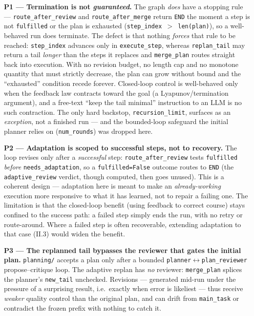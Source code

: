 \documentclass[11pt]{article}
\newcommand{\code}[1]{\texttt{#1}}
\begin{document}
\textbf{P1 --- Termination is not \emph{guaranteed}.} The graph \emph{does} have a stopping rule --- \code{route\_after\_review}
and \code{route\_after\_merge} return \code{END} the moment a step is not \code{fulfilled} or the plan is exhausted
(\code{step\_index $>$ len(plan)}), so a well-behaved run does terminate. The defect is that nothing \emph{forces} that rule to be
reached: \code{step\_index} advances only in \code{execute\_step}, whereas \code{replan\_tail} may return a tail \emph{longer} than
the steps it replaces and \code{merge\_plan} routes straight back into execution. With no revision budget, no length cap and no
monotone quantity that must strictly decrease, the plan can grow without bound and the ``exhausted'' condition recede forever.
Closed-loop control is well-behaved only when the feedback law contracts toward the goal (a Lyapunov/termination argument), and a
free-text ``keep the tail minimal'' instruction to an LLM is no such contraction. The only hard backstop, \code{recursion\_limit},
surfaces as an \emph{exception}, not a finished run --- and the bounded-loop safeguard the initial planner relies on
(\code{num\_rounds}) was dropped here.

\textbf{P2 --- Adaptation is scoped to successful steps, not to recovery.} The loop revises only after a \emph{successful} step:
\code{route\_after\_review} tests \code{fulfilled} \emph{before} \code{needs\_adaptation}, so a \code{fulfilled=False} outcome routes
to \code{END} (the \code{adaptive\_review} verdict, though computed, then goes unused). This is a coherent design --- adaptation here
is meant to make an \emph{already-working} execution more responsive to what it has learned, not to repair a failing one. The
limitation is that the closed-loop benefit (using feedback to correct course) stays confined to the success path: a failed step
simply ends the run, with no retry or route-around. Where a failed step is often recoverable, extending adaptation to that case
(II.3) would widen the benefit.

\textbf{P3 --- The replanned tail bypasses the reviewer that gates the initial plan.} \code{planning/} accepts a plan only after a
bounded \code{planner}$\leftrightarrow$\code{plan\_reviewer} propose--critique loop. The adaptive replan has \emph{no} reviewer:
\code{merge\_plan} splices the planner's \code{new\_tail} unchecked. Revisions --- generated mid-run under the pressure of a
surprising result, i.e.\ exactly when error is likeliest --- thus receive \emph{weaker} quality control than the original plan, and
can drift from \code{main\_task} or contradict the frozen prefix with nothing to catch it.
\end{document}

